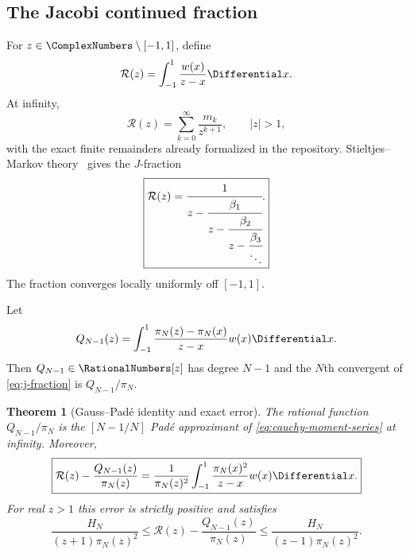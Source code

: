 \documentclass[11pt,oneside]{article}
\newtheorem{theorem}{Theorem}[section]
\theoremstyle{definition}
\theoremstyle{remark}
\numberwithin{equation}{section}
\begin{document}
\subsection{The Jacobi continued fraction}
For $z\in\ComplexNumbers\setminus[-1,1]$, define
\begin{equation}
 \mathcal R(z)=\int_{-1}^{1}\frac{w(x)}{z-x}\Differential x.
 \label{eq:cauchy-transform}
\end{equation}
At infinity,
\begin{equation}
 \mathcal R(z)=\sum_{k=0}^{\infty}\frac{m_k}{z^{k+1}},
 \qquad |z|>1,
 \label{eq:cauchy-moment-series}
\end{equation}
with the exact finite remainders already formalized in the repository.
Stieltjes--Markov theory~\cite{Chihara,BakerGravesMorris} gives the $J$-fraction
\begin{equation}
 \boxed{
 \mathcal R(z)=
 \cfrac1{z-\cfrac{\beta_1}{z-
        \cfrac{\beta_2}{z-
        \cfrac{\beta_3}{\ddots}}}}.}
 \label{eq:j-fraction}
\end{equation}
The fraction converges locally uniformly off $[-1,1]$.

Let
\begin{equation}
 Q_{N-1}(z)=\int_{-1}^{1}
 \frac{\pi_N(z)-\pi_N(x)}{z-x}w(x)\Differential x.
 \label{eq:second-kind-polynomial}
\end{equation}
Then $Q_{N-1}\in\RationalNumbers[z]$ has degree $N-1$ and the $N$th convergent of
\cref{eq:j-fraction} is $Q_{N-1}/\pi_N$.

\begin{theorem}[Gauss--Pad\'e identity and exact error]
\label{thm:pade-error}
The rational function $Q_{N-1}/\pi_N$ is the $[N-1/N]$ Pad\'e approximant of
\cref{eq:cauchy-moment-series} at infinity.  Moreover,
\begin{equation}
 \boxed{
 \mathcal R(z)-\frac{Q_{N-1}(z)}{\pi_N(z)}
 =\frac1{\pi_N(z)^2}
   \int_{-1}^{1}\frac{\pi_N(x)^2}{z-x}w(x)\Differential x.}
 \label{eq:pade-exact-error}
\end{equation}
For real $z>1$ this error is strictly positive and satisfies
\begin{equation}
 \frac{H_N}{(z+1)\pi_N(z)^2}
 \le
 \mathcal R(z)-\frac{Q_{N-1}(z)}{\pi_N(z)}
 \le
 \frac{H_N}{(z-1)\pi_N(z)^2}.
 \label{eq:pade-two-sided-error}
\end{equation}
\end{theorem}
\end{document}
